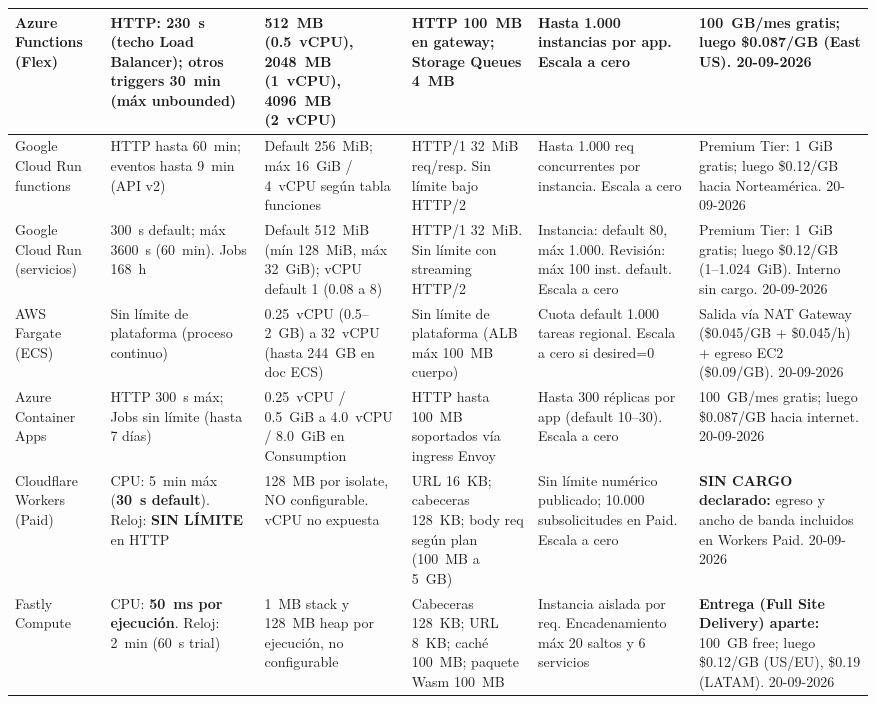 \documentclass[12pt, letterpaper, table, xcdraw]{inf-pucv}
\begin{document}
\begin{landscape}
{\begin{longtable}{|p{2.6cm}|p{3.2cm}|p{3.4cm}|p{3.2cm}|p{3.6cm}|p{4.2cm}|}
Azure Functions (Flex) & HTTP: 230~s (techo Load Balancer); otros triggers 30~min (máx unbounded) & 512~MB (0.5~vCPU), 2048~MB (1~vCPU), 4096~MB (2~vCPU) & HTTP 100~MB en gateway; Storage Queues 4~MB & Hasta 1.000 instancias por app. Escala a cero & 100~GB/mes gratis; luego \$0.087/GB (East US). 20-09-2026 \\ \hline

Google Cloud Run functions & HTTP hasta 60~min; eventos hasta 9~min (API v2) & Default 256~MiB; máx 16~GiB / 4~vCPU según tabla funciones & HTTP/1 32~MiB req/resp. Sin límite bajo HTTP/2 & Hasta 1.000 req concurrentes por instancia. Escala a cero & Premium Tier: 1~GiB gratis; luego \$0.12/GB hacia Norteamérica. 20-09-2026 \\ \hline

Google Cloud Run (servicios) & 300~s default; máx 3600~s (60~min). Jobs 168~h & Default 512~MiB (mín 128~MiB, máx 32~GiB); vCPU default 1 (0.08 a 8) & HTTP/1 32~MiB. Sin límite con streaming HTTP/2 & Instancia: default 80, máx 1.000. Revisión: máx 100 inst. default. Escala a cero & Premium Tier: 1~GiB gratis; luego \$0.12/GB (1--1.024~GiB). Interno sin cargo. 20-09-2026 \\ \hline

AWS Fargate (ECS) & Sin límite de plataforma (proceso continuo) & 0.25~vCPU (0.5--2~GB) a 32~vCPU (hasta 244~GB en doc ECS) & Sin límite de plataforma (ALB máx 100~MB cuerpo) & Cuota default 1.000 tareas regional. Escala a cero si desired=0 & Salida vía NAT Gateway (\$0.045/GB + \$0.045/h) + egreso EC2 (\$0.09/GB). 20-09-2026 \\ \hline

Azure Container Apps & HTTP 300~s máx; Jobs sin límite (hasta 7 días) & 0.25~vCPU / 0.5~GiB a 4.0~vCPU / 8.0~GiB en Consumption & HTTP hasta 100~MB soportados vía ingress Envoy & Hasta 300 réplicas por app (default 10--30). Escala a cero & 100~GB/mes gratis; luego \$0.087/GB hacia internet. 20-09-2026 \\ \hline

Cloudflare Workers (Paid) & CPU: 5~min máx (\textbf{30~s default}). Reloj: \textbf{SIN LÍMITE} en HTTP & 128~MB por isolate, NO configurable. vCPU no expuesta & URL 16~KB; cabeceras 128~KB; body req según plan (100~MB a 5~GB) & Sin límite numérico publicado; 10.000 subsolicitudes en Paid. Escala a cero & \textbf{SIN CARGO declarado:} egreso y ancho de banda incluidos en Workers Paid. 20-09-2026 \\ \hline

Fastly Compute & CPU: \textbf{50~ms por ejecución}. Reloj: 2~min (60~s trial) & 1~MB stack y 128~MB heap por ejecución, no configurable & Cabeceras 128~KB; URL 8~KB; caché 100~MB; paquete Wasm 100~MB & Instancia aislada por req. Encadenamiento máx 20 saltos y 6 servicios & \textbf{Entrega (Full Site Delivery) aparte:} 100~GB free; luego \$0.12/GB (US/EU), \$0.19 (LATAM). 20-09-2026 \\ \hline


\end{longtable}}
\end{landscape}
\end{document}
